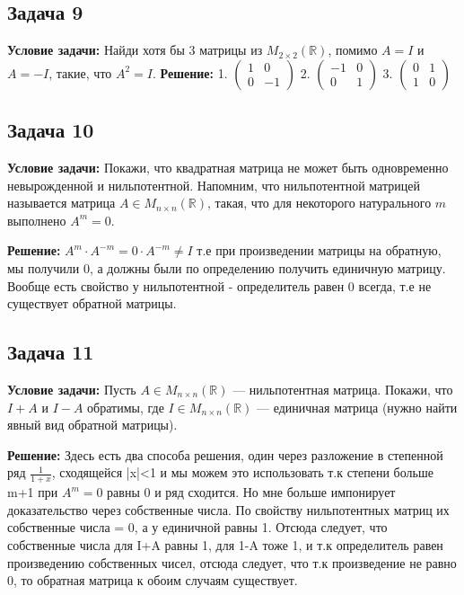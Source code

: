 \documentclass[a4paper,12pt]{article}
\begin{document}
\subsection{Задача 9}
\textbf{Условие задачи:}
Найди хотя бы 3 матрицы из $M_{2 \times 2}(\mathbb{R})$, помимо $A = I$ и $A = -I$, такие, что $A^2 = I$.
\textbf{Решение: }
1. \( \begin{pmatrix} 1 & 0 \\ 0 & -1 \end{pmatrix} \)
2. \( \begin{pmatrix} -1 & 0 \\ 0 & 1 \end{pmatrix} \)
3. \( \begin{pmatrix} 0 & 1 \\ 1 & 0 \end{pmatrix} \)

\subsection{Задача 10}
\textbf{Условие задачи:}
Покажи, что квадратная матрица не может быть одновременно невырожденной и нильпотентной. Напомним, что нильпотентной матрицей называется матрица $A \in M_{n \times n}(\mathbb{R})$, такая, что для некоторого натурального $m$ выполнено $A^m = 0$.

\textbf{Решение: }
$A^m\cdot A^{-m}= 0\cdot A^{-m}\ne I$ т.е при произведении матрицы на обратную, мы получили 0, а должны были по определению получить единичную матрицу. Вообще есть свойство у нильпотентной - определитель равен 0 всегда, т.е не существует обратной матрицы.


\subsection{Задача 11}
\textbf{Условие задачи:}
Пусть $A \in M_{n \times n}(\mathbb{R})$ — нильпотентная матрица. Покажи, что $I + A$ и $I - A$ обратимы, где $I \in M_{n \times n}(\mathbb{R})$ — единичная матрица (нужно найти явный вид обратной матрицы).

\textbf{Решение: } Здесь есть два способа решения, один через разложение в степенной ряд $\frac{1}{1+x}$, сходящейся |x|<1 и мы можем это использовать т.к степени больше m+1 при $A^m=0$ равны 0 и ряд сходится. Но мне больше импонирует доказательство через собственные числа. По свойству нильпотентных матриц их собственные числа = 0, а у единичной равны 1. Отсюда следует, что собственные числа для I+A равны 1, для 1-A тоже 1,  и т.к определитель равен произведению собственных чисел, отсюда следует, что т.к произведение не равно 0, то обратная матрица к обоим случаям существует.
\end{document}
